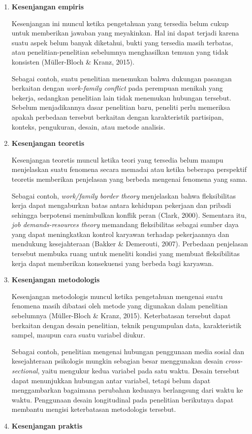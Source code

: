 \documentclass[
  indonesian,
  letterpaper,
  DIV=11,
  numbers=noendperiod]{scrreprt}
\begin{document}
\begin{enumerate}
\def\labelenumi{\arabic{enumi}.}
\item
  \textbf{Kesenjangan empiris}

  Kesenjangan ini muncul ketika pengetahuan yang tersedia belum cukup
  untuk memberikan jawaban yang meyakinkan. Hal ini dapat terjadi karena
  suatu aspek belum banyak diketahui, bukti yang tersedia masih
  terbatas, atau penelitian-penelitian sebelumnya menghasilkan temuan
  yang tidak konsisten (Müller-Bloch \& Kranz, 2015).

  Sebagai contoh, suatu penelitian menemukan bahwa dukungan pasangan
  berkaitan dengan \emph{work-family conflict} pada perempuan menikah
  yang bekerja, sedangkan penelitian lain tidak menemukan hubungan
  tersebut. Sebelum menjadikannya dasar penelitian baru, peneliti perlu
  memeriksa apakah perbedaan tersebut berkaitan dengan karakteristik
  partisipan, konteks, pengukuran, desain, atau metode analisis.
\item
  \textbf{Kesenjangan teoretis}

  Kesenjangan teoretis muncul ketika teori yang tersedia belum mampu
  menjelaskan suatu fenomena secara memadai atau ketika beberapa
  perspektif teoretis memberikan penjelasan yang berbeda mengenai
  fenomena yang sama.

  Sebagai contoh, \emph{work/family border theory} menjelaskan bahwa
  fleksibilitas kerja dapat mengaburkan batas antara kehidupan pekerjaan
  dan pribadi sehingga berpotensi menimbulkan konflik peran (Clark,
  2000). Sementara itu, \emph{job demands-resources theory} memandang
  fleksibilitas sebagai sumber daya yang dapat meningkatkan kontrol
  karyawan terhadap pekerjaannya dan mendukung kesejahteraan (Bakker \&
  Demerouti, 2007). Perbedaan penjelasan tersebut membuka ruang untuk
  meneliti kondisi yang membuat fleksibilitas kerja dapat memberikan
  konsekuensi yang berbeda bagi karyawan.
\item
  \textbf{Kesenjangan metodologis}

  Kesenjangan metodologis muncul ketika pengetahuan mengenai suatu
  fenomena masih dibatasi oleh metode yang digunakan dalam penelitian
  sebelumnya (Müller-Bloch \& Kranz, 2015). Keterbatasan tersebut dapat
  berkaitan dengan desain penelitian, teknik pengumpulan data,
  karakteristik sampel, maupun cara suatu variabel diukur.

  Sebagai contoh, penelitian mengenai hubungan penggunaan media sosial
  dan kesejahteraan psikologis mungkin sebagian besar menggunakan desain
  \emph{cross-sectional}, yaitu mengukur kedua variabel pada satu waktu.
  Desain tersebut dapat menunjukkan hubungan antar variabel, tetapi
  belum dapat menggambarkan bagaimana perubahan keduanya berlangsung
  dari waktu ke waktu. Penggunaan desain longitudinal pada penelitian
  berikutnya dapat membantu mengisi keterbatasan metodologis tersebut.
\item
  \textbf{Kesenjangan praktis}


\end{enumerate}
\end{document}

